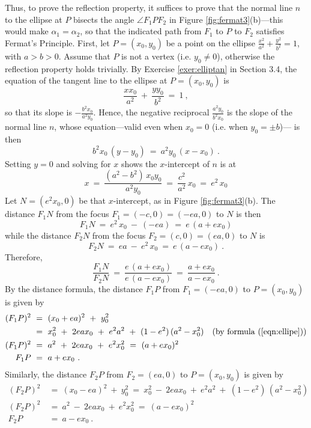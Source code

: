 Thus, to prove the reflection property, it suffices to prove that the normal
line $n$ to the ellipse at $P$ bisects the angle $\angle F_1PF_2$ in Figure
\ref{fig:fermat3}(b)---this would make $\alpha_1=\alpha_2$, so that the
indicated path from $F_1$ to $P$ to $F_2$ satisfies Fermat's Principle. First,
let $P=(x_0,y_0)$ be a point on the ellipse
$\frac{x^2}{a^2} + \frac{y^2}{b^2} = 1$, with $a>b>0$. Assume that $P$ is not a
vertex (i.e. $y_0 \ne 0$), otherwise the reflection property holds trivially.
By Exercise \ref{exer:elliptan} in Section 3.4, the equation of the tangent line
to the ellipse at $P=(x_0,y_0)$ is
\begin{equation}\label{eqn:elliptan}
 \frac{x x_0}{a^2} ~+~ \frac{y y_0}{b^2} ~=~ 1 ~,
\end{equation}
so that its slope is $-\frac{b^2 x_0}{a^2 y_0}$. Hence, the negative reciprocal
$\frac{a^2 y_0}{b^2 x_0}$ is the slope of the normal line $n$, whose
equation---valid even when $x_0=0$ (i.e. when $y_0=\pm b$)--- is then
\begin{equation}\label{eqn:ellipnormal}
b^2 x_0\,(y - y_0) ~=~ a^2 y_0\,(x - x_0) ~.
\end{equation}
Setting $y=0$ and solving for $x$ shows the $x$-intercept of $n$ is at
\[
x ~=~ \frac{(a^2 - b^2)\,x_0 y_0}{a^2 y_0} ~=~ \frac{c^2}{a^2}\,x_0 ~=~ e^2\,x_0
\]
Let $N = (e^2 x_0,0)$ be that $x$-intercept, as in Figure \ref{fig:fermat3}(b).
The distance $F_1N$ from the focus $F_1 =(-c,0)=(-ea,0)$ to $N$ is then
\[
F_1N ~=~ e^2\,x_0 ~-~ (-ea) ~=~ e\,(a + ex_0)
\]
while the distance $F_2N$ from the focus $F_2 =(c,0)=(ea,0)$ to $N$ is
\[
F_2N ~=~ ea ~-~ e^2\,x_0  ~=~ e\,(a - ex_0) ~.
\]
Therefore,
\[
\frac{F_1N}{F_2N} ~=~ \frac{e\,(a + ex_0)}{e\,(a - ex_0)} ~=~ \frac{a + ex_0}{a - ex_0} ~.
\]
\newpage
\noindent By the distance formula, the distance $F_1P$ from $F_1=(-ea,0)$ to
$P=(x_0,y_0)$ is given by
\begin{align*}
(F_1P)^2 ~&=~ (x_0 + ea)^2 ~+~ y_0^2\\
&=~ x_0^2 ~+~ 2eax_0 ~+~ e^2a^2 ~+~ (1-e^2)\,(a^2 - x_0^2)
\quad\text{(by formula (\ref{eqn:ellipe}))}\\
(F_1P)^2 ~&=~ a^2 ~+~ 2eax_0 ~+~ e^2x_0^2 ~=~ (a + ex_0)^2\\
F_1P ~&=~a + ex_0 ~.
\end{align*}
Similarly, the distance $F_2P$ from $F_2=(ea,0)$ to $P=(x_0,y_0)$ is given by
\begin{align*}
(F_2P)^2 ~&=~ (x_0 - ea)^2 ~+~ y_0^2 ~=~ x_0^2 ~-~ 2eax_0 ~+~ e^2a^2 ~+~ (1-e^2)\,(a^2 - x_0^2)\\
(F_2P)^2 ~&=~ a^2 ~-~ 2eax_0 ~+~ e^2x_0^2 ~=~ (a - ex_0)^2\\
F_2P ~&=~a - ex_0 ~.
\end{align*}

